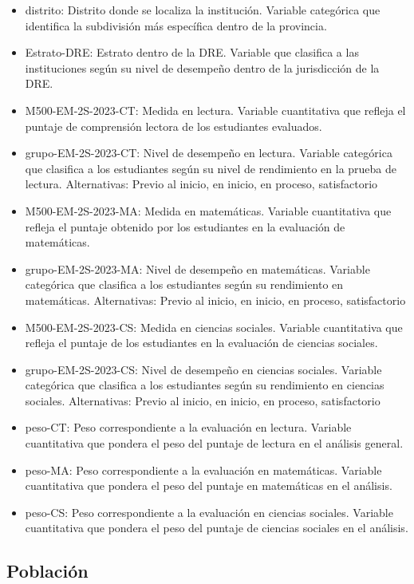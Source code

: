 \documentclass[
]{article}
\begin{document}
\begin{itemize}
    \item distrito: Distrito donde se localiza la institución. Variable categórica que identifica la subdivisión más específica dentro de la provincia.
    \item Estrato-DRE: Estrato dentro de la DRE. Variable que clasifica a las instituciones según su nivel de desempeño dentro de la jurisdicción de la DRE.
    \item M500-EM-2S-2023-CT: Medida en lectura. Variable cuantitativa que refleja el puntaje de comprensión lectora de los estudiantes evaluados.
    \item grupo-EM-2S-2023-CT: Nivel de desempeño en lectura. Variable categórica que clasifica a los estudiantes según su nivel de rendimiento en la prueba de lectura. Alternativas: Previo al inicio, en inicio, en proceso, satisfactorio
    \item M500-EM-2S-2023-MA: Medida en matemáticas. Variable cuantitativa que refleja el puntaje obtenido por los estudiantes en la evaluación de matemáticas.
    \item grupo-EM-2S-2023-MA: Nivel de desempeño en matemáticas. Variable categórica que clasifica a los estudiantes según su rendimiento en matemáticas. Alternativas: Previo al inicio, en inicio, en proceso, satisfactorio
    \item M500-EM-2S-2023-CS: Medida en ciencias sociales. Variable cuantitativa que refleja el puntaje de los estudiantes en la evaluación de ciencias sociales.
    \item grupo-EM-2S-2023-CS: Nivel de desempeño en ciencias sociales. Variable categórica que clasifica a los estudiantes según su rendimiento en ciencias sociales. Alternativas: Previo al inicio, en inicio, en proceso, satisfactorio
    \item peso-CT: Peso correspondiente a la evaluación en lectura. Variable cuantitativa que pondera el peso del puntaje de lectura en el análisis general.
    \item peso-MA: Peso correspondiente a la evaluación en matemáticas. Variable cuantitativa que pondera el peso del puntaje en matemáticas en el análisis.
    \item peso-CS: Peso correspondiente a la evaluación en ciencias sociales. Variable cuantitativa que pondera el peso del puntaje de ciencias sociales en el análisis.

\end{itemize}

\subsection*{Población}\label{poblaciuxf3n}
\end{document}
